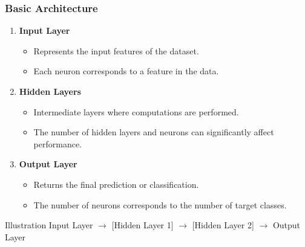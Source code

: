 \documentclass[aspectratio=169]{beamer}
\begin{document}
\begin{frame}[fragile]
    \frametitle{Basic Architecture}
    \begin{enumerate}
        \item \textbf{Input Layer}
        \begin{itemize}
            \item Represents the input features of the dataset.
            \item Each neuron corresponds to a feature in the data.
        \end{itemize}
        
        \item \textbf{Hidden Layers}
        \begin{itemize}
            \item Intermediate layers where computations are performed.
            \item The number of hidden layers and neurons can significantly affect performance.
        \end{itemize}
        
        \item \textbf{Output Layer}
        \begin{itemize}
            \item Returns the final prediction or classification.
            \item The number of neurons corresponds to the number of target classes.
        \end{itemize}
    \end{enumerate}
    
    \begin{block}{Illustration}
        Input Layer $\rightarrow$ [Hidden Layer 1] $\rightarrow$ [Hidden Layer 2] $\rightarrow$ Output Layer
    \end{block}
\end{frame}
\end{document}
